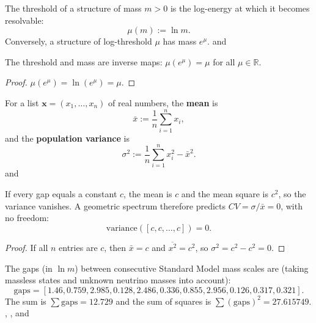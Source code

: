 \begin{definition}
The threshold of a structure of mass $m > 0$ is the log-energy at which it becomes resolvable:
\begin{equation}
\mu(m) := \ln m .
\end{equation}
Conversely, a structure of log-threshold $\mu$ has mass $e^\mu$.
 and 
\end{definition}

\begin{theorem}
The threshold and mass are inverse maps: $\mu(e^\mu) = \mu$ for all $\mu \in \mathbb{R}$.
\end{theorem}

\begin{proof}
$\mu(e^\mu) = \ln(e^\mu) = \mu$.
\end{proof}

\begin{definition}
For a list $\mathbf{x} = (x_1, \ldots, x_n)$ of real numbers, the \textbf{mean} is
\begin{equation}
\bar{x} := \frac{1}{n}\sum_{i=1}^n x_i ,
\end{equation}
and the \textbf{population variance} is
\begin{equation}
\sigma^2 := \frac{1}{n}\sum_{i=1}^n x_i^2 - \bar{x}^2 .
\end{equation}
 and 
\end{definition}

\begin{theorem}
If every gap equals a constant $c$, the mean is $c$ and the mean square is $c^2$, so the variance vanishes. A geometric spectrum therefore predicts $CV = \sigma/\bar{x} = 0$, with no freedom:
\begin{equation}
\text{variance}([c, c, \ldots, c]) = 0 .
\end{equation}
\end{theorem}

\begin{proof}
If all $n$ entries are $c$, then $\bar{x} = c$ and $\overline{x^2} = c^2$, so $\sigma^2 = c^2 - c^2 = 0$.
\end{proof}

\begin{definition}
The gaps (in $\ln m$) between consecutive Standard Model mass scales are (taking massless states and unknown neutrino masses into account):
\begin{equation}
\text{gaps} = [1.46, 0.759, 2.985, 0.128, 2.486, 0.336, 0.855, 2.956, 0.126, 0.317, 0.321] .
\end{equation}
The sum is $\sum \text{gaps} = 12.729$ and the sum of squares is $\sum (\text{gaps})^2 = 27.615749$.
, , and 
\end{definition}

